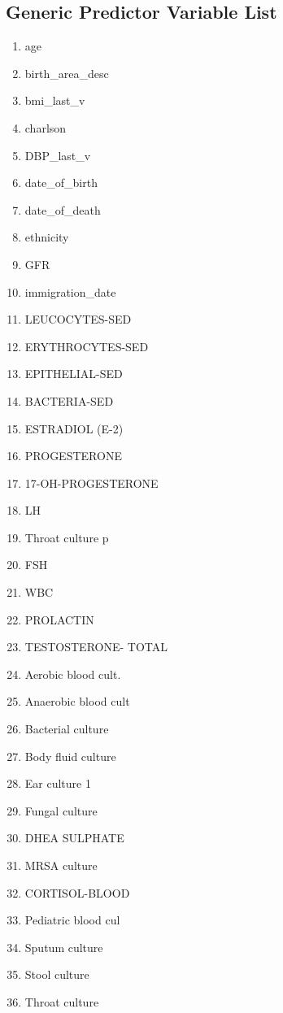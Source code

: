 \documentclass[a4paper,12pt]{article}
\begin{document}
\begin{appendices}
   		\section{Generic Predictor Variable List}
   		\begin{enumerate}
   			\itemsep0em 
   			\item age
   			\item birth\_area\_desc
   			\item bmi\_last\_v
   			\item charlson
   			\item DBP\_last\_v
   			\item date\_of\_birth
   			\item date\_of\_death
   			\item ethnicity
   			\item GFR
   			\item immigration\_date
   			\item LEUCOCYTES-SED
   			\item ERYTHROCYTES-SED
   			\item EPITHELIAL-SED
   			\item BACTERIA-SED
   			\item ESTRADIOL (E-2)
   			\item PROGESTERONE
   			\item 17-OH-PROGESTERONE
   			\item LH
   			\item Throat culture p
   			\item FSH
   			\item WBC
   			\item PROLACTIN
   			\item TESTOSTERONE- TOTAL
   			\item Aerobic blood cult.
   			\item Anaerobic blood cult
   			\item Bacterial culture
   			\item Body fluid culture
   			\item Ear culture 1
   			\item Fungal culture
   			\item DHEA SULPHATE
   			\item MRSA culture
   			\item CORTISOL-BLOOD
   			\item Pediatric blood cul
   			\item Sputum culture
   			\item Stool culture
   			\item Throat culture

\end{enumerate}
\end{appendices}
\end{document}

